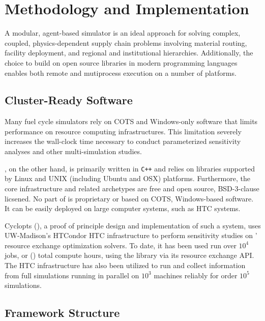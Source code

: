 \section{Methodology and Implementation}

A modular, agent-based simulator is an ideal approach for solving complex, coupled,
physics-dependent supply chain problems involving material routing, facility
deployment, and regional and institutional hierarchies. Additionally, the choice to 
build \Cyclus on open source libraries in modern programming languages enables 
both remote and mutiprocess execution on a number of platforms.

\subsection{Cluster-Ready Software}

Many fuel cycle simulators rely on \gls{COTS} and Windows-only software that limits 
performance on resource computing infrastructures. This limitation severely 
increases the wall-clock time necessary to conduct parameterized sensitivity 
analyses and other multi-simulation studies. 

\Cyclus, on the other hand, is primarily written in \texttt{C++} and relies on 
libraries supported by Linux and UNIX (including Ubuntu and OSX) platforms. 
Furthermore, the core infrastructure and related archetypes are free and 
open source, BSD-3-clause licsened. No part of \Cyclus is proprietary or based 
on \gls{COTS}, Windows-based software. It can be easily deployed 
on large computer systems, such as \acrlong{HTC} systems.

Cyclopts (), a proof of principle design and implementation of such a
system, uses UW-Madison's HTCondor \gls{HTC} infrastructure to perform sensitivity
studies on \Cyclus' resource exchange optimization solvers. To date, it has been
used run over $10^4$ jobs, or () total compute hours, using
the \Cyclus library via its resource exchange \gls{API}.
The \gls{HTC} infrastructure has also been utilized to run and collect
information from full \Cyclus simulations running in parallel on $10^3$
machines reliably for order $10^5$ simulations.


\subsection{Framework Structure}

